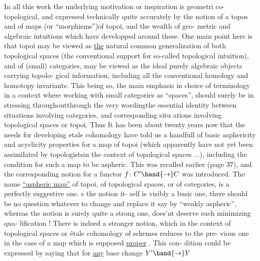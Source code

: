 In all this work the underlying motivation or inspiration is geometri%
co-topological,  and expressed technically quite accurately by the notion
of a topos and of maps (or ``morphisms'')of topoi,  and the wealth of geo-%
metric and algebraic intuitions  which have developped around these.
One main point here is that topoi may be viewed as \uline{the} natural common
generalization of both topological spaces (the conventional support for
so-called topological intuition),  and of  (small) categories,
  may be viewed as the ideal purely algebraic objects carrying topolo-%
gical information,  including all the conventional homology and homotopy
invariants.  This being so, the main emphasis in choice of terminology
in a context where working with small categories as ``spaces'', should
surely be in stressing throughout\hand{,}through the very wording\hand{,}the essential
identity between situations involving categories,  and corresponding situ%
ations involving topological spaces or topoi.  Thus It has been about
twenty years now that the  needs for developing etale cohomology
have told us a handfull of basic asphericity and acyclicity properties
for a map of topoi (which apparently have not yet been assimilated by
topologists\hand{,}in the context of  topological spaces ...),  including the
condition for such a map to be aspheric. This was recalled earlier
(page 37),  and the corresponding notion for a functor $f\colon C'\hand{\to}C$  was
introduced.  The name \uline{``aspheric map''} of topoi, of topological spaces,
or of categories,  is  a perfectly suggestive one.   s the notion it-%
self is visibly a basic one,  there should be no question whatever to
change   and replace it say by ``weakly aspheric'',  whereas the notion
is surely quite a strong one,    does'nt deserve such minimizing qua-%
lification !  There is indeed a stronger notion,  which in the context
of topological spaces or étale cohomology of schemes reduces to the pre-%
vious one in the  case of a map which is supposed \uline{proper} .  This con-%
dition could be expressed by saying that for \uline{any} base change $Y'\hand{\to}Y$

